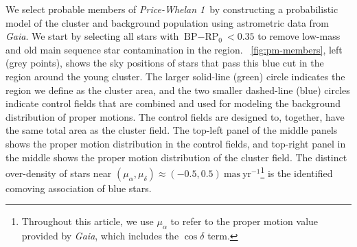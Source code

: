 \documentclass[modern]{aastex62}
\newcommand{\gaia}{\textsl{Gaia}}
\newcommand{\masyr}{\ensuremath{\textrm{mas}~\textrm{yr}^{-1}}}
\newcommand{\clustername}{\textsl{Price-Whelan 1}}
\newcommand{\bprp}{\ensuremath{\textrm{BP} - \textrm{RP}}}
\begin{document}
We select probable members of \clustername\ by constructing a probabilistic model of the cluster and background population using astrometric data from \gaia.
We start by selecting all stars with $\bprp_0 < 0.35$ to remove low-mass and old main sequence star contamination in the region.
\figurename~\ref{fig:pm-members}, left (grey points), shows the sky positions of stars that pass this blue cut in the region around the young cluster.
The larger solid-line (green) circle indicates the region we define as the cluster area, and the two smaller dashed-line (blue) circles indicate control fields that are combined and used for modeling the background distribution of proper motions.
The control fields are designed to, together, have the same total area as the cluster field.
The top-left panel of the middle panels shows the proper motion distribution in the control fields, and top-right panel in the middle shows the proper motion distribution of the cluster field.
The distinct over-density of stars near $(\mu_\alpha, \mu_\delta) \approx (-0.5, 0.5)~\masyr$\footnote{Throughout this article, we use $\mu_\alpha$ to refer to the proper motion value provided by \gaia, which includes the $\cos\delta$ term.} is the identified comoving association of blue stars.
\end{document}
